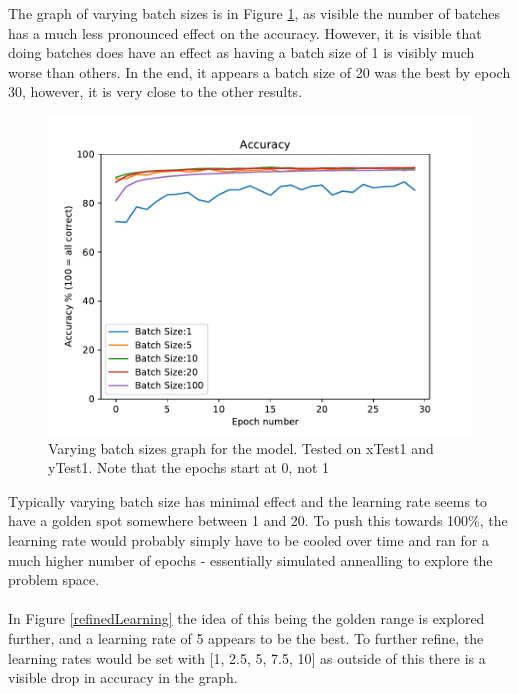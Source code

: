 \documentclass{article}
\begin{document}
\newpage

The graph of varying batch sizes is in Figure \ref{batchGraph}, as visible the
number of batches has a much less pronounced effect on the accuracy. However, it
is visible that doing batches does have an effect as having a batch size of 1
is visibly much worse than others. In the end, it appears a batch size of 20 was
the best by epoch 30, however, it is very close to the other results.

\begin{figure}[ht]
    \centering
    \includegraphics[scale=1]{batchGraph.pdf}
    \caption{
        Varying batch sizes graph for the model. Tested on xTest1 and yTest1.
        Note that the epochs start at 0, not 1
    }
    \label{batchGraph}
\end{figure}

Typically varying batch size has minimal effect and the
learning rate seems to have a golden spot somewhere between 1 and 20. To push
this towards 100\%, the learning rate would probably simply have to be cooled
over time and ran for a much higher number of epochs - essentially simulated
annealling to explore the problem space. \\ \\
\newpage
In Figure \ref{refinedLearning} the idea of this being the golden range is
explored further, and a learning rate of 5 appears to be the best. To further
refine, the learning rates would be set with [1, 2.5, 5, 7.5, 10] as outside of
this there is a visible drop in accuracy in the graph.
\end{document}
